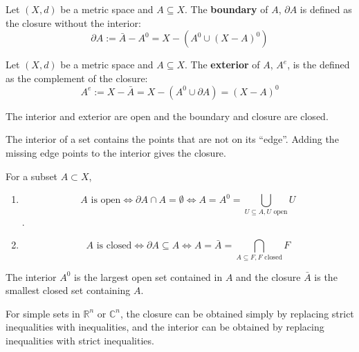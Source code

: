 \begin{definition}
	Let $(X, d)$ be a metric space and $A \subseteq X$. The \textbf{boundary} of $A$, $\partial A$ is defined as the closure without the interior:
	\[
		\partial A := \bar{A} - A^0 = X - (A^0 \cup {(X - A)}^0)
	\]
\end{definition}

\begin{definition}
	Let $(X, d)$ be a metric space and $A \subseteq X$. The \textbf{exterior} of $A$, $A^e$, is the defined as the complement of the closure:
	\[
		A^e := X - \bar{A} = X - (A^0 \cup \partial A) = {(X - A)}^0
	\]
\end{definition}

\begin{remark}
	The interior and exterior are open and the boundary and closure are closed.
\end{remark}

\begin{remark}
	The interior of a set contains the points that are not on its ``edge''. Adding the missing edge points to the interior gives the closure.
\end{remark}

\begin{proposition}
	For a subset $A \subset X$,
	\begin{enumerate}
		\item \[
			A \text{ is open} \Longleftrightarrow \partial A \cap A = \emptyset \Longleftrightarrow A = A^0 = \bigcup_{U \subseteq A, U \text{ open}} U
		\].
		\item \[
			A \text{ is closed} \Longleftrightarrow \partial A \subseteq A \Longleftrightarrow A = \bar{A} = \bigcap_{A \subseteq F, F \text{ closed}} F
		\]
	\end{enumerate}
\end{proposition}

\begin{remark}
	The interior $A^0$ is the largest open set contained in $A$ and the closure $\bar{A}$ is the smallest closed set containing $A$.
\end{remark}

\begin{remark}
	For simple sets in $\mathbb{R}^n$ or $\mathbb{C}^n$, the closure can be obtained simply by replacing strict inequalities with inequalities, and the interior can be obtained by replacing inequalities with strict inequalities.
\end{remark}

